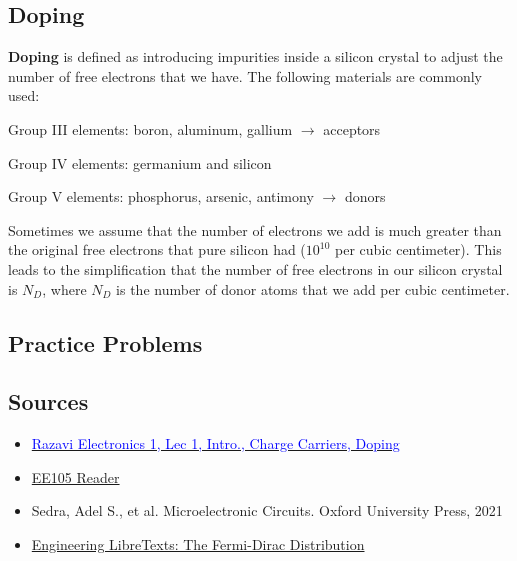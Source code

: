 \subsection{Doping}
\textbf{Doping} is defined as introducing impurities inside a silicon crystal to adjust the number of free electrons that we have. The following materials are commonly used:
\begin{pline}
    \item Group III elements: boron, aluminum, gallium $\rightarrow$ acceptors
    \item Group IV elements: germanium and silicon
    \item Group V elements: phosphorus, arsenic, antimony $\rightarrow$ donors
\end{pline}
Sometimes we assume that the number of electrons we add is much greater than the original free electrons that pure silicon had ($10^{10}$ per cubic centimeter). This leads to the simplification that the number of free electrons in our silicon crystal is $N_D$, where $N_D$ is the number of donor atoms that we add per cubic centimeter.

\subsection{Practice Problems}

\subsection{Sources}
\begin{itemize}
    \item \href{https://www.youtube.com/watch?v=yQDfVJzEymI}{\textcolor{blue}{Razavi Electronics 1, Lec 1, Intro., Charge Carriers, Doping}}
    \item \href{https://file.notion.so/f/f/048d6522-202b-48d4-b5d9-bc005bd602e2/214bf1f0-292f-48d6-9016-737d9f5da155/ee105_reader_v3.pdf?id=237a4300-3dbe-47d1-888b-ffae90d8352b&table=block&spaceId=048d6522-202b-48d4-b5d9-bc005bd602e2&expirationTimestamp=1714435200000&signature=yx-H1qvZJIodPfazOpwXX0Ce2mWMG8skOHl45xoPxus&downloadName=ee105_reader_v3.pdf}{EE105 Reader}
    \item Sedra, Adel S., et al. Microelectronic Circuits. Oxford University Press, 2021
    \item \href{https://eng.libretexts.org/Bookshelves/Materials_Science/TLP_Library_II/22%3A_Introduction_to_Semiconductors/22.2%3A_The_FermiDirac_Distribution}{Engineering LibreTexts: The Fermi-Dirac Distribution}
\end{itemize}

